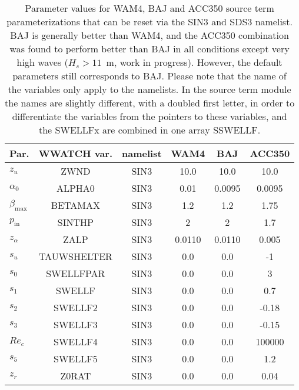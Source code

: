 \begin{table} \begin{center}
\begin{tabular}{|l|c|c|c|c|c|} \hline \hline
Par.         &  WWATCH var. & namelist & WAM4 & BAJ  & ACC350 \\
\hline
  $z_u$ &  ZWND                       & SIN3 & 10.0    & 10.0   & 10.0 \\
  $\alpha_0$ &  ALPHA0                & SIN3 & 0.01    & 0.0095 &  0.0095 \\
  $\beta_{\mathrm{max}}$ & BETAMAX    & SIN3 & 1.2     & 1.2    &  1.75 \\
  $p_{\mathrm{in}}$ &  SINTHP         & SIN3 & 2       & 2      &  1.7 \\
  $z_\alpha$ &  ZALP                  & SIN3 & 0.0110  & 0.0110 &  0.005 \\
  $s_u$ &  TAUWSHELTER                & SIN3 & 0.0     & 0.0    & -1   \\
  $s_0$ &  SWELLFPAR                  & SIN3 & 0.0     & 0.0    &  3   \\
  $s_1$ &  SWELLF                     & SIN3 & 0.0     & 0.0    &  0.7 \\
  $s_2$ &  SWELLF2                    & SIN3 & 0.0     & 0.0    &  -0.18 \\
  $s_3$ &  SWELLF3                    & SIN3 & 0.0     & 0.0    &  -0.15 \\
  $Re_c$&  SWELLF4                    & SIN3 & 0.0     & 0.0    &  100000 \\
  $s_5$ &  SWELLF5                    & SIN3 & 0.0     & 0.0    &  1.2 \\
  $z_r$ &  Z0RAT                      & SIN3 & 0.0     & 0.0    &  0.04 \\
\hline
\end{tabular} \end{center}
\caption{Parameter values for WAM4, BAJ and ACC350 source term
parameterizations that can be reset via the SIN3 and SDS3 namelist. BAJ is
generally better than WAM4, and the ACC350 combination was found to perform
better than BAJ in all conditions except very high waves ($H_s > 11$~m, work in
progress). However, the default parameters still corresponds to BAJ. Please
note that the name of the variables only apply to the namelists. In the source
term module the names are slightly different, with a doubled first letter, in
order to differentiate the variables from the pointers to these variables, and
the SWELLFx are combined in one array SSWELLF.} \label{tab:WAM4_parSIN}
\end{table}

